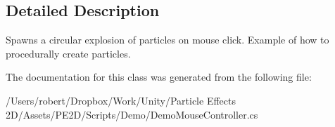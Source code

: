 \subsection{Detailed Description}
Spawns a circular explosion of particles on mouse click. Example of how to procedurally create particles. 



The documentation for this class was generated from the following file\+:\begin{DoxyCompactItemize}
\item 
/\+Users/robert/\+Dropbox/\+Work/\+Unity/\+Particle Effects 2\+D/\+Assets/\+P\+E2\+D/\+Scripts/\+Demo/Demo\+Mouse\+Controller.\+cs\end{DoxyCompactItemize}
